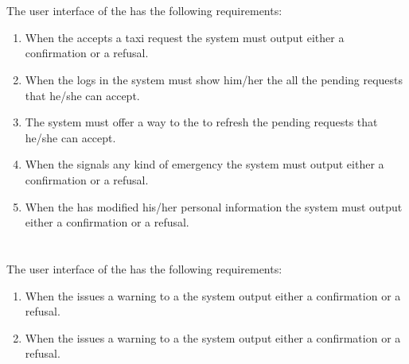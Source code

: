 \paragraph{} \hfill \\
The user interface of the  has the following requirements:

\begin{enumerate} [resume*]

\item When the \emph{} accepts a taxi request the system must output either a confirmation or a refusal.

\item When the \emph{} logs in the system must show him/her the all the pending requests that he/she can accept.

\item The system must offer a way to the \emph{} to refresh the pending requests that he/she can accept.

\item When the \emph{} signals any kind of emergency the system must output either a confirmation or a refusal.

\item When the \emph{} has modified his/her personal information the system must output either a confirmation or a refusal.

\end{enumerate}

\paragraph{} \hfill \\
The user interface of the  has the following requirements:

\begin{enumerate} [resume*]

\item When the \emph{} issues a warning to a \emph{} the system output either a confirmation or a refusal.

\item When the \emph{} issues a warning to a \emph{} the system output either a confirmation or a refusal.

\end{enumerate}


